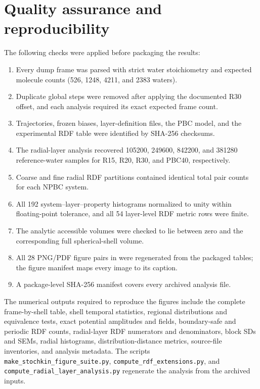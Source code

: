 \documentclass[11pt]{article}
\begin{document}
\section{Quality assurance and reproducibility}

The following checks were applied before packaging the results:
\begin{enumerate}
 \item Every dump frame was parsed with strict water stoichiometry and expected
       molecule counts (526, 1248, 4211, and 2383 waters).
 \item Duplicate global steps were removed after applying the documented R30
       offset, and each analysis required its exact expected frame count.
 \item Trajectories, frozen biases, layer-definition files, the PBC model, and
       the experimental RDF table were identified by SHA-256 checksums.
 \item The radial-layer analysis recovered 105200, 249600, 842200, and 381280
       reference-water samples for R15, R20, R30, and PBC40, respectively.
 \item Coarse and fine radial RDF partitions contained identical total pair
       counts for each NPBC system.
 \item All 192 system--layer--property histograms normalized to unity within
       floating-point tolerance, and all 54 layer-level RDF metric rows were
       finite.
 \item The analytic accessible volumes were checked to lie between zero and
       the corresponding full spherical-shell volume.
 \item All 28 PNG/PDF figure pairs in 
       were regenerated from the packaged tables;
       the figure manifest maps every image to its caption.
 \item A package-level SHA-256 manifest covers every archived analysis file.
\end{enumerate}

The numerical outputs required to reproduce the figures include the complete
frame-by-shell table, shell temporal statistics, regional distributions and
equivalence tests, exact potential amplitudes and fields, boundary-safe and
periodic RDF counts, radial-layer RDF numerators and denominators, block SDs
and SEMs, radial histograms, distribution-distance metrics, source-file
inventories, and analysis metadata.  The scripts
\texttt{make\_stochkin\_figure\_suite.py},
\texttt{compute\_rdf\_extensions.py}, and
\texttt{compute\_radial\_layer\_analysis.py} regenerate the analysis from
the archived inputs.
\end{document}

